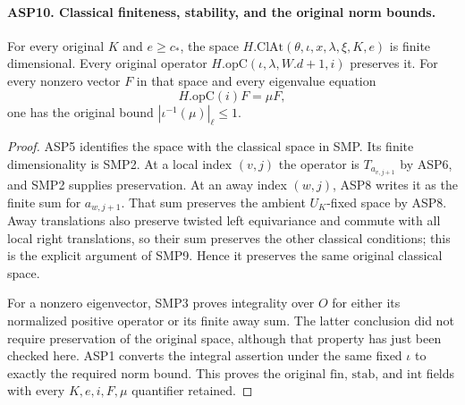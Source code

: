 \documentclass[11pt,a4paper]{article}
\numberwithin{equation}{section}
\theoremstyle{remark}\newtheorem{remark}[theorem]{Remark}
\begin{document}
\paragraph{ASP10. Classical finiteness, stability, and the original norm bounds.}
\label{claim:ASP10}
For every original $K$ and $e\geq c_*$, the
space $H.\mathrm{ClAt}(\theta,\iota,\allowbreak{} x,\lambda,\xi,\allowbreak{} K,\allowbreak{} e)$
is finite dimensional.  Every original operator
$H.\mathrm{opC}(\iota,\lambda,\allowbreak{} W.d+1,\allowbreak{} i)$ preserves it.
For every nonzero vector $F$ in that space and
every eigenvalue equation
\[
             H.\mathrm{opC}(i)F=\mu F,
\]
one has the original bound $|\iota^{-1}(\mu)|_\ell\leq1$.
\begin{proof}
ASP5 identifies the space with the classical
space in SMP.  Its finite dimensionality is
SMP2.  At a local index $(v,\allowbreak{} j)$ the operator
is $T_{a_{v,\allowbreak{} j+1}}$ by ASP6, and SMP2 supplies
preservation.  At an away index $(w,\allowbreak{} j)$,
ASP8 writes it as the finite sum for
$a_{w,\allowbreak{} j+1}$.  That sum preserves the ambient
$U_K$-fixed space by ASP8.  Away translations
also preserve twisted left equivariance and
commute with all local right translations,
so their sum preserves the other classical
conditions; this is the explicit argument of
SMP9.  Hence it preserves the same original
classical space.

For a nonzero eigenvector, SMP3 proves
integrality over $O$ for either its normalized
positive operator or its finite away sum.
The latter conclusion did not require
preservation of the original space, although
that property has just been checked here.
ASP1 converts the integral assertion under
the same fixed $\iota$ to exactly the required
norm bound.  This proves the original
$\mathrm{fin}$, $\mathrm{stab}$, and
$\mathrm{int}$ fields with every $K,\allowbreak{} e,\allowbreak{} i,\allowbreak{} F,\mu$
quantifier retained.
\end{proof}

\end{document}
